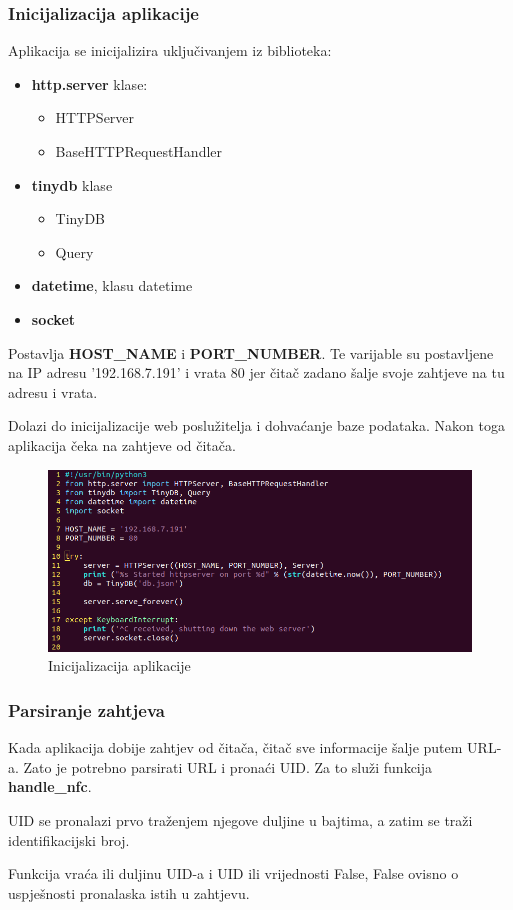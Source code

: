 \documentclass[times, utf8, zavrsni]{fer}
\begin{document}
\subsubsection{Inicijalizacija aplikacije}
Aplikacija se inicijalizira uključivanjem iz biblioteka:
\begin{itemize}
\item \textbf{http.server} klase:
	\begin{itemize}
	\item HTTPServer
	\item BaseHTTPRequestHandler
	\end{itemize}
\item \textbf{tinydb} klase
	\begin{itemize}
	\item TinyDB
	\item Query
	\end{itemize}
\item \textbf{datetime}, klasu datetime
\item \textbf{socket}
\end{itemize}

Postavlja \textbf{HOST\_NAME} i \textbf{PORT\_NUMBER}. Te varijable su postavljene na IP adresu '192.168.7.191' i vrata 80  jer čitač zadano šalje svoje zahtjeve na tu adresu i vrata.\par
Dolazi do inicijalizacije web poslužitelja i dohvaćanje baze podataka. Nakon toga aplikacija čeka na zahtjeve od čitača.

\begin{figure}[h]
\includegraphics[scale=0.5]{init.png}
\centering
\caption{Inicijalizacija aplikacije}
\centering
\end{figure}

\subsubsection{Parsiranje zahtjeva}
Kada aplikacija dobije zahtjev od čitača, čitač sve informacije šalje putem URL-a. Zato je potrebno parsirati URL i pronaći UID. Za to služi funkcija \textbf{handle\_nfc}.\par
UID se pronalazi prvo traženjem njegove duljine u bajtima, a zatim se traži identifikacijski broj.\par 
Funkcija vraća ili duljinu UID-a i UID ili vrijednosti False, False ovisno o uspješnosti pronalaska istih u zahtjevu.
\end{document}
